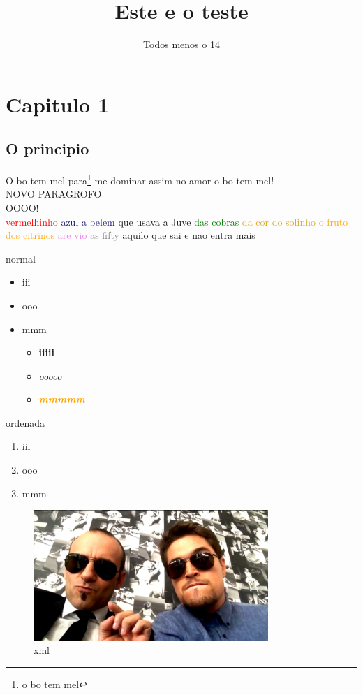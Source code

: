 \documentclass[11pt, a4paper, oneside]{article}
\title{Este e o teste}
\author{Todos menos o 14}
\begin{document}
\maketitle
\newpage


\section{Capitulo 1}
\subsection{O principio }
O bo tem mel para\footnote{o bo tem mel} me dominar assim no amor o bo tem mel!\\
 NOVO PARAGROFO\\
OOOO!\\


\textcolor{red}{vermelhinho }\textcolor{MidnightBlue}{azul a belem }\textcolor{WildStrawberry}{que usava a Juve }\textcolor{Green}{das cobras }\textcolor{Goldenrod}{ da cor do solinho }\textcolor{Orange}{ o fruto dos citrinos }\textcolor{Violet}{  are vio }\textcolor{Gray}{ as fifty }\textcolor{RawSienna}{ aquilo que sai e nao entra mais}
\\

normal
\begin{itemize}
\item iii\\
\item ooo\\
\item mmm\\
\begin{itemize}
\item \textbf{iiiii}\\
\item \textit{ooooo}\\
\item \underline{\textbf{\textit{\textcolor{Orange}{mmmmm}}}}\\
\end{itemize}
\end{itemize}

ordenada

\begin{enumerate}
\item iii\\
\item ooo\\
\item mmm\\
\end{enumerate}


\begin{figure}[!h]
\centering
\includegraphics[width=3.5in] {botem.jpg}
\caption{xml}
\end{figure}
\end{document}
